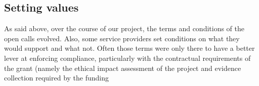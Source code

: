 \subsection{Setting values}\label{setting-values}

As said above, over the course of our project, the terms and conditions
of the open calls evolved. Also, some service providers set conditions
on what they would support and what not. Often those terms were only
there to have a better lever at enforcing compliance, particularly with
the contractual requirements of the grant (namely the ethical impact
assessment of the project and evidence collection required by the funding